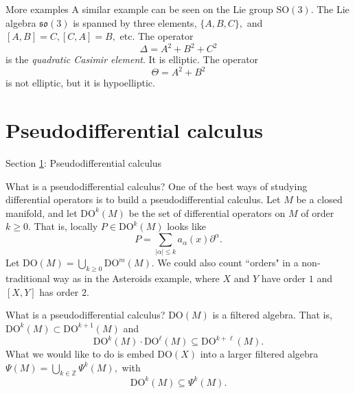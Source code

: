 \documentclass{beamer}
\numberwithin{equation}{section}
\theoremstyle{plain}
\theoremstyle{plain}
\theoremstyle{definition}
\theoremstyle{plain}
\theoremstyle{plain}
\theoremstyle{definition}
\newcommand{\Rl}{\mathbb{R}}
\newcommand{\Itgr}{\mathbb{Z}}
\begin{document}
\begin{frame}{More examples}
  A similar example can be seen on the Lie group $\mathrm{SO}(3).$ The Lie algebra $\mathfrak{so}(3)$
  is spanned by three elements, $\{A,B,C\},$ and $[A,B]=C, [C,A] = B,$ etc.
  \pause
  The operator
  \[
      \Delta = A^2+B^2+C^2
  \]
  is the \emph{quadratic Casimir element}. It is elliptic.
  \pause
  The operator
  \[
    \Theta = A^2+B^2
  \]
  is not elliptic, but it is hypoelliptic.
\end{frame}
% 
% 



\section{Pseudodifferential calculus}\label{psido_section}

\begin{frame}
    \huge{Section \ref{psido_section}: Pseudodifferential calculus}
\end{frame}

\begin{frame}{What is a pseudodifferential calculus?}
  One of the best ways of studying differential operators is to build a pseudodifferential calculus.
  \pause
  Let $M$ be a closed manifold, and let $\mathrm{DO}^k(M)$ be the set of differential operators on $M$
  of order $k\geq 0.$ That is, locally $P \in \mathrm{DO}^k(M)$ looks like
  \[
    P = \sum_{|\alpha|\leq k} a_{\alpha}(x)\partial^{\alpha}.
  \]
  Let $\mathrm{DO}(M) = \bigcup_{k\geq 0} \mathrm{DO}^m(M).$
  \pause
  We could also count ``orders" in a non-traditional way as in the Asteroids example, where $X$ and $Y$ have order $1$ and $[X,Y]$ has order $2.$
\end{frame}

\begin{frame}{What is a pseudodifferential calculus?}
  $\mathrm{DO}(M)$ is a filtered algebra. That is, $\mathrm{DO}^{k}(M)\subset \mathrm{DO}^{k+1}(M)$ and
  \[
    \mathrm{DO}^k(M)\cdot \mathrm{DO}^\ell(M) \subseteq \mathrm{DO}^{k+\ell}(M).
  \]
  What we would like to do is embed $\mathrm{DO}(X)$ into a larger filtered algebra $\Psi(M)=\bigcup_{k\in \Itgr} \Psi^k(M),$ with
  \[
    \mathrm{DO}^k(M) \subseteq \Psi^k(M).
  \]
\end{frame}
\end{document}
